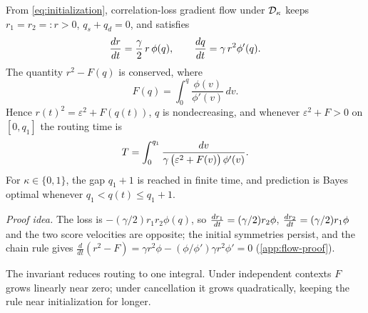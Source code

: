 \begin{lemma}
\label{lem:invariant}
From \cref{eq:initialization}, correlation-loss gradient flow under $\mathcal D_{\kappa}$ keeps $r_1=r_2=:r>0$, $q_s+q_d=0$, and satisfies
\[
 \frac{d r}{d t}=\frac{\gamma}{2}\,r\,\phi(q),\qquad \frac{d q}{d t}=\gamma\,r^2\phi'(q).
\]
The quantity $r^2-F(q)$ is conserved, where
\[
 F(q)=\int_0^q\frac{\phi(v)}{\phi'(v)}\,dv.
\]
Hence $r(t)^2=\varepsilon^2+F(q(t))$, $q$ is nondecreasing, and whenever $\varepsilon^2+F>0$ on $[0,q_1]$ the routing time is
\begin{equation}
 T=\int_0^{q_1}\frac{dv}{\gamma\,\bigl(\varepsilon^2+F(v)\bigr)\,\phi'(v)}.
 \label{eq:time}
\end{equation}
For $\kappa\in\{0,1\}$, the gap $q_1+1$ is reached in finite time, and prediction is Bayes optimal whenever $q_1<q(t)\le q_1+1$.
\end{lemma}
\emph{Proof idea.} The loss is $-(\gamma/2)r_1r_2\phi(q)$, so $\frac{d r_1}{d t}=(\gamma/2)r_2\phi$, $\frac{d r_2}{d t}=(\gamma/2)r_1\phi$ and the two score
velocities are opposite; the initial symmetries persist, and the chain rule gives $\tfrac{d}{dt}(r^2-F)=\gamma r^2\phi-(\phi/\phi')\gamma r^2\phi'=0$ (\cref{app:flow-proof}).


The invariant reduces routing to one integral. Under independent contexts $F$ grows linearly near zero;
under cancellation it grows quadratically, keeping the rule near initialization for longer.

